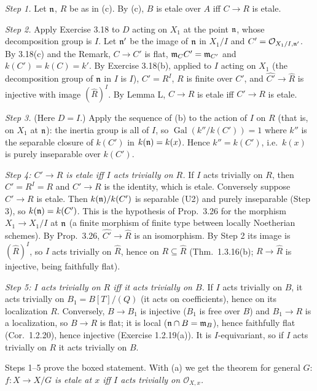 \documentclass[11pt]{article}
\begin{document}
\emph{Step 1.} Let $\mathfrak n$, $R$ be as in (c). By (c), $B$ is etale over $A$ iff $C\to R$ is etale.

\emph{Step 2.} Apply Exercise 3.18 to $D$ acting on $X_1$ at the point $\mathfrak n$, whose decomposition group is $I$. Let $\mathfrak n'$ be the image of $\mathfrak n$ in $X_1/I$ and $C'=\mathcal O_{X_1/I,\mathfrak n'}$. By 3.18(c) and the Remark, $C\to C'$ is flat, $\mathfrak m_CC'=\mathfrak m_{C'}$ and $k(C')=k(C)=k'$. By Exercise 3.18(b), applied to $I$ acting on $X_1$ (the decomposition group of $\mathfrak n$ in $I$ is $I$), $C'=R^I$, $R$ is finite over $C'$, and $\widehat{C'}\to\widehat R$ is injective with image $(\widehat R)^I$. By Lemma L, $C\to R$ is etale iff $C'\to R$ is etale.

\emph{Step 3.} (Here $D=I$.) Apply the sequence of (b) to the action of $I$ on $R$ (that is, on $X_1$ at $\mathfrak n$): the inertia group is all of $I$, so $\operatorname{Gal}(k''/k(C'))=1$ where $k''$ is the separable closure of $k(C')$ in $k(\mathfrak n)=k(x)$. Hence $k''=k(C')$, i.e.\ $k(x)$ is purely inseparable over $k(C')$.

\emph{Step 4: $C'\to R$ is etale iff $I$ acts trivially on $R$.} If $I$ acts trivially on $R$, then $C'=R^I=R$ and $C'\to R$ is the identity, which is etale. Conversely suppose $C'\to R$ is etale. Then $k(\mathfrak n)/k(C')$ is separable (U2) and purely inseparable (Step 3), so $k(\mathfrak n)=k(C')$. This is the hypothesis of Prop.~3.26 for the morphism $X_1\to X_1/I$ at $\mathfrak n$ (a finite morphism of finite type between locally Noetherian schemes). By Prop.~3.26, $\widehat{C'}\to\widehat R$ is an isomorphism. By Step 2 its image is $(\widehat R)^I$, so $I$ acts trivially on $\widehat R$, hence on $R\subseteq\widehat R$ (Thm.~1.3.16(b); $R\to\widehat R$ is injective, being faithfully flat).

\emph{Step 5: $I$ acts trivially on $R$ iff it acts trivially on $B$.} If $I$ acts trivially on $B$, it acts trivially on $B_1=B[T]/(Q)$ (it acts on coefficients), hence on its localization $R$. Conversely, $B\to B_1$ is injective ($B_1$ is free over $B$) and $B_1\to R$ is a localization, so $B\to R$ is flat; it is local ($\mathfrak n\cap B=\mathfrak m_B$), hence faithfully flat (Cor.~1.2.20), hence injective (Exercise 1.2.19(a)). It is $I$-equivariant, so if $I$ acts trivially on $R$ it acts trivially on $B$.

Steps 1--5 prove the boxed statement. With (a) we get the theorem for general $G$: \emph{$f:X\to X/G$ is etale at $x$ iff $I$ acts trivially on $\mathcal O_{X,x}$.}
\end{document}
